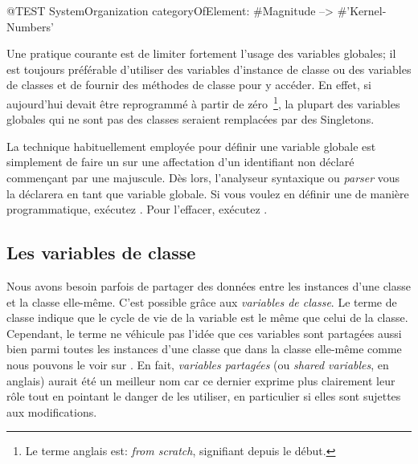 \documentclass[a4paper,10pt,twoside]{book}
\begin{document}
\begin{code}{@TEST}
SystemOrganization categoryOfElement: #Magnitude --> #'Kernel-Numbers'
\end{code}

Une pratique courante est de limiter fortement l'usage des variables globales;
il est toujours préférable d'utiliser des variables d'instance de classe ou des variables de classes et de fournir des méthodes de classe pour y accéder.
En effet, si aujourd'hui \pharo devait être reprogrammé à partir de
zéro~\footnote{Le terme anglais est: \emph{from scratch}, signifiant depuis le début.}, la plupart des variables globales qui ne sont pas des classes seraient remplacées par des Singletons.

La technique habituellement employée pour définir une variable globale
est simplement de faire un  sur une affectation d'un identifiant
non déclaré commençant par une majuscule. Dès lors,
l'analyseur syntaxique ou \emph{parser} vous 
la déclarera en tant que variable globale.  
Si vous voulez en définir une de manière programmatique, exécutez
.
Pour l'effacer, exécutez .

\subsection{Les variables de classe}

Nous avons besoin parfois de partager des données entre les instances d'une classe et la classe elle-même.
C'est possible grâce aux \emph{variables de classe}. 
Le terme  de classe indique que le cycle de vie
de la variable est le même que celui de la classe. Cependant, 
le terme ne véhicule pas l'idée que ces variables sont partagées aussi bien parmi toutes
les instances d'une classe que dans la classe elle-même comme nous pouvons le voir sur .
En fait, \emph{variables partagées} (ou \emph{shared variables}, en anglais) aurait
été un meilleur nom car ce dernier exprime plus clairement leur rôle
tout en pointant le danger de les utiliser, en particulier si elles sont 
sujettes aux modifications.
\end{document}
